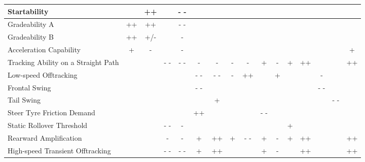 \begin{table}[H]
\begin{threeparttable}
\begin{tabulary}{\textwidth}{|L|c|c|c|c|c|c|c|c|c|c|c|c|c|c|c|}
            \hline
            Startability &       & ++    &       & - -    &       &       &       &       &       &       &       &       &       &       &  \bigstrut\\
            \hline
            Gradeability A & ++    & ++    &       & - -    &       &       &       &       &       &       &       &       &       &       &  \bigstrut\\
            \hline
            Gradeability B & ++    & +/-   &       & -     &       &       &       &       &       &       &       &       &       &       &  \bigstrut\\
            \hline
            Acceleration Capability & +     & -     &       & -     &       &       &       &       &       &       &       &       &       &       & + \bigstrut\\
            \hline
            Tracking Ability on a Straight Path &       &       & - -    & - -    & -     & -     & -     & -     & +     & -     & +     & ++    &       &       & ++ \bigstrut\\
            \hline
            Low-speed Offtracking &       &       &       &       & - -    & - -    & -     & ++    &       & +     &       &       & -     &       &  \bigstrut\\
            \hline
            Frontal Swing &       &       &       &       & - -    &       &       &       &       &       &       &       & - -    &       &  \bigstrut\\
            \hline
            Tail Swing &       &       &       &       &       & +     &       &       &       &       &       &       &       & - -    &  \bigstrut\\
            \hline
            Steer Tyre Friction Demand &       &       &       &       & ++    &       &       &       & - -    &       &       &       &       &       &  \bigstrut\\
            \hline
            Static Rollover Threshold &       &       & - -    & -     &       &       &       &       &       &       & +     &       &       &       &  \bigstrut\\
            \hline
            Rearward Amplification &       &       & -     & -     & +     & ++    & +     & - -    & +     & -     & +     & ++    &       &       & ++ \bigstrut\\
            \hline
            High-speed Transient Offtracking &       &       & - -    & - -    & +     & ++    &       &       & +     & -     &       & ++    &       &       & ++ \bigstrut\\

\end{tabulary}
\end{threeparttable}
\end{table}
